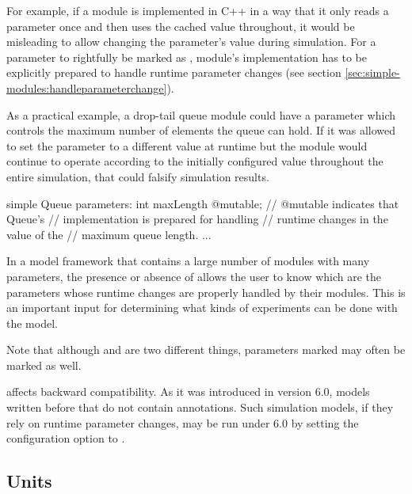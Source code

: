 For example, if a module is implemented in C++ in a way that it only reads a
parameter once and then uses the cached value throughout, it would be misleading
to allow changing the parameter's value during simulation. For a parameter to
rightfully be marked as , module's implementation has to be
explicitly prepared to handle runtime parameter changes (see section
\ref{sec:simple-modules:handleparameterchange}).

As a practical example, a drop-tail queue module could have a 
parameter which controls the maximum number of elements the queue can hold. If
it was allowed to set the  parameter to a different value at
runtime but the module would continue to operate according to the initially
configured value throughout the entire simulation, that could falsify simulation
results.

\begin{ned}
simple Queue
{
    parameters:
        int maxLength @mutable; // @mutable indicates that Queue's
                                // implementation is prepared for handling
                                // runtime changes in the value of the
                                // maximum queue length.
        ...
}
\end{ned}

In a model framework that contains a large number of modules with many
parameters, the presence or absence of  allows the user to know
which are the parameters whose runtime changes are properly handled by their
modules. This is an important input for determining what kinds of experiments
can be done with the model.

\begin{hint}
    Note that although  and  are two
    different things, parameters marked  may often be marked
     as well.
\end{hint}

\begin{note}
     affects backward compatibility. As it was introduced in
    {\opp} version 6.0, models written before that do not contain
     annotations. Such simulation models, if they rely on
    runtime parameter changes, may be run under {\opp} 6.0 by setting the
     configuration option to .
\end{note}


\subsection{Units}
\label{sec:ned-lang:units}

